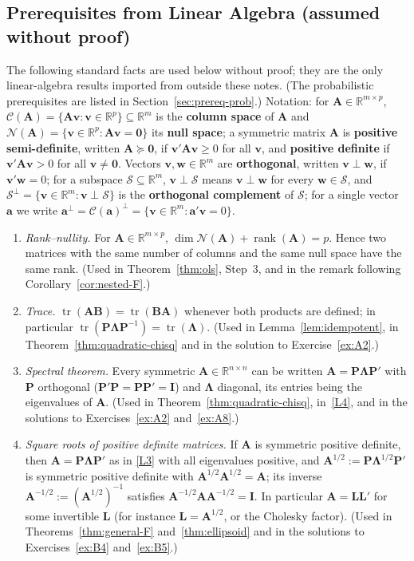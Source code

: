 \documentclass[14pt]{extarticle}
\theoremstyle{plain}
\theoremstyle{definition}
\theoremstyle{remark}
\DeclareMathOperator\tr{tr}
\DeclareMathOperator\rank{rank}
\newcommand{\bI}{\mathbf{I}}
\newcommand{\bzero}{\mathbf{0}}
\newcommand{\bw}{\mathbf{w}}
\newcommand{\bA}{\mathbf{A}}
\newcommand{\bP}{\mathbf{P}}
\newcommand{\ba}{\mathbf{a}}
\newcommand{\bv}{\mathbf{v}}
\newcommand{\Real}{\mathbb{R}}
\newcommand{\calC}{\mathcal{C}}
\begin{document}
\subsection{Prerequisites from Linear Algebra (assumed without proof)}

The following standard facts are used below without proof; they are the only linear-algebra results imported from outside these notes. (The probabilistic prerequisites are listed in Section~\ref{sec:prereq-prob}.) Notation: for $\bA \in \Real^{m \times p}$, $\calC(\bA) = \{\bA\bv : \bv \in \Real^p\} \subseteq \Real^m$ is the \textbf{column space} of $\bA$ and $\mathcal{N}(\bA) = \{\bv \in \Real^p : \bA\bv = \bzero\}$ its \textbf{null space}; a symmetric matrix $\bA$ is \textbf{positive semi-definite}, written $\bA \succeq \bzero$, if $\bv'\bA\bv \geqslant 0$ for all $\bv$, and \textbf{positive definite} if $\bv'\bA\bv > 0$ for all $\bv \neq \bzero$. Vectors $\bv, \bw \in \Real^m$ are \textbf{orthogonal}, written $\bv \perp \bw$, if $\bv'\bw = 0$; for a subspace $\mathcal{S} \subseteq \Real^m$, $\bv \perp \mathcal{S}$ means $\bv \perp \bw$ for every $\bw \in \mathcal{S}$, and $\mathcal{S}^\perp = \{\bv \in \Real^m : \bv \perp \mathcal{S}\}$ is the \textbf{orthogonal complement} of $\mathcal{S}$; for a single vector $\ba$ we write $\ba^\perp = \calC(\ba)^\perp = \{\bv \in \Real^m : \ba'\bv = 0\}$.
\begin{enumerate}[label=\textup{(L\arabic*)}]
\item\label{L1} \emph{Rank--nullity.} For $\bA \in \Real^{m \times p}$, $\dim\mathcal{N}(\bA) + \rank(\bA) = p$. Hence two matrices with the same number of columns and the same null space have the same rank. (Used in Theorem~\ref{thm:ols}, Step~3, and in the remark following Corollary~\ref{cor:nested-F}.)
\item\label{L2} \emph{Trace.} $\tr(\bA\mathbf{B}) = \tr(\mathbf{B}\bA)$ whenever both products are defined; in particular $\tr(\bP\boldsymbol\Lambda\bP^{-1}) = \tr(\boldsymbol\Lambda)$. (Used in Lemma~\ref{lem:idempotent}, in Theorem~\ref{thm:quadratic-chisq} and in the solution to Exercise~\ref{ex:A2}.)
\item\label{L3} \emph{Spectral theorem.} Every symmetric $\bA \in \Real^{n \times n}$ can be written $\bA = \bP\boldsymbol\Lambda\bP'$ with $\bP$ orthogonal ($\bP'\bP = \bP\bP' = \bI$) and $\boldsymbol\Lambda$ diagonal, its entries being the eigenvalues of $\bA$. (Used in Theorem~\ref{thm:quadratic-chisq}, in~\ref{L4}, and in the solutions to Exercises~\ref{ex:A2} and~\ref{ex:A8}.)
\item\label{L4} \emph{Square roots of positive definite matrices.} If $\bA$ is symmetric positive definite, then $\bA = \bP\boldsymbol\Lambda\bP'$ as in \ref{L3} with all eigenvalues positive, and $\bA^{1/2} := \bP\boldsymbol\Lambda^{1/2}\bP'$ is symmetric positive definite with $\bA^{1/2}\bA^{1/2} = \bA$; its inverse $\bA^{-1/2} := (\bA^{1/2})^{-1}$ satisfies $\bA^{-1/2}\bA\bA^{-1/2} = \bI$. In particular $\bA = \mathbf{L}\mathbf{L}'$ for some invertible $\mathbf{L}$ (for instance $\mathbf{L} = \bA^{1/2}$, or the Cholesky factor). (Used in Theorems~\ref{thm:general-F} and~\ref{thm:ellipsoid} and in the solutions to Exercises~\ref{ex:B4} and~\ref{ex:B5}.)
\end{enumerate}
\end{document}
